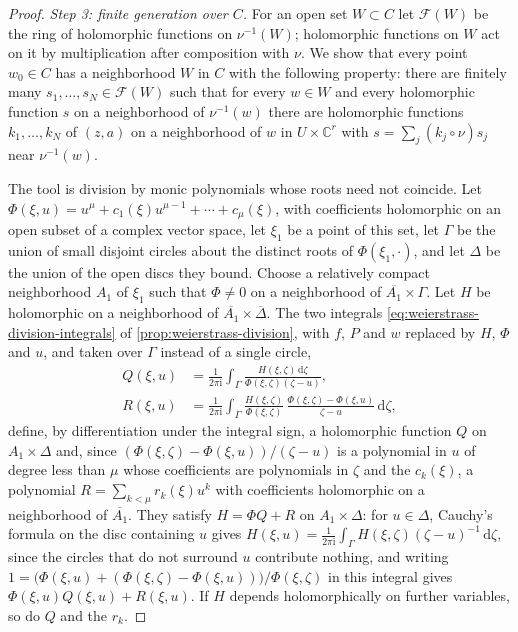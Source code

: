 \begin{proof}
\emph{Step 3: finite generation over $C$.} For an open set $W\subset C$ let $\mathcal F(W)$ be the ring of holomorphic functions on $\nu^{-1}(W)$; holomorphic functions on $W$ act on it by multiplication after composition with $\nu$. We show that every point $w_0\in C$ has a neighborhood $W$ in $C$ with the following property: there are finitely many $s_1,\ldots,s_N\in\mathcal F(W)$ such that for every $w\in W$ and every holomorphic function $s$ on a neighborhood of $\nu^{-1}(w)$ there are holomorphic functions $k_1,\ldots,k_N$ of $(z,a)$ on a neighborhood of $w$ in $U\times\mathbb C^r$ with $s=\sum_j(k_j\circ\nu)s_j$ near $\nu^{-1}(w)$.

The tool is division by monic polynomials whose roots need not coincide. Let $\Phi(\xi,u)=u^\mu+c_1(\xi)u^{\mu-1}+\cdots+c_\mu(\xi)$, with coefficients holomorphic on an open subset of a complex vector space, let $\xi_1$ be a point of this set, let $\Gamma$ be the union of small disjoint circles about the distinct roots of $\Phi(\xi_1,\cdot)$, and let $\Delta$ be the union of the open discs they bound. Choose a relatively compact neighborhood $A_1$ of $\xi_1$ such that $\Phi\neq0$ on a neighborhood of $\overline{A_1}\times\Gamma$. Let $H$ be holomorphic on a neighborhood of $\overline{A_1}\times\overline\Delta$. The two integrals \eqref{eq:weierstrass-division-integrals} of \cref{prop:weierstrass-division}, with $f$, $P$ and $w$ replaced by $H$, $\Phi$ and $u$, and taken over $\Gamma$ instead of a single circle,
\begin{align*}
 Q(\xi,u)&=\frac1{2\pi\mathrm i}\int_\Gamma\frac{H(\xi,\zeta)\,\mathrm d\zeta}{\Phi(\xi,\zeta)(\zeta-u)},\\
 R(\xi,u)&=\frac1{2\pi\mathrm i}\int_\Gamma\frac{H(\xi,\zeta)}{\Phi(\xi,\zeta)}\,\frac{\Phi(\xi,\zeta)-\Phi(\xi,u)}{\zeta-u}\,\mathrm d\zeta,
\end{align*}
define, by differentiation under the integral sign, a holomorphic function $Q$ on $A_1\times\Delta$ and, since $(\Phi(\xi,\zeta)-\Phi(\xi,u))/(\zeta-u)$ is a polynomial in $u$ of degree less than $\mu$ whose coefficients are polynomials in $\zeta$ and the $c_k(\xi)$, a polynomial $R=\sum_{k<\mu}r_k(\xi)u^k$ with coefficients holomorphic on a neighborhood of $\overline{A_1}$. They satisfy $H=\Phi Q+R$ on $A_1\times\Delta$: for $u\in\Delta$, Cauchy's formula on the disc containing $u$ gives $H(\xi,u)=\frac1{2\pi\mathrm i}\int_\Gamma H(\xi,\zeta)(\zeta-u)^{-1}\,\mathrm d\zeta$, since the circles that do not surround $u$ contribute nothing, and writing $1=\bigl(\Phi(\xi,u)+(\Phi(\xi,\zeta)-\Phi(\xi,u))\bigr)/\Phi(\xi,\zeta)$ in this integral gives $\Phi(\xi,u)Q(\xi,u)+R(\xi,u)$. If $H$ depends holomorphically on further variables, so do $Q$ and the $r_k$.


\end{proof}
